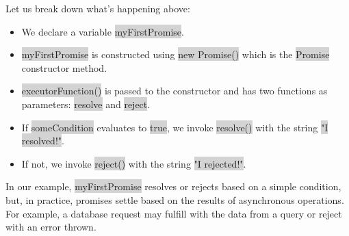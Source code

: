 \documentclass[11pt]{article}
\begin{document}
Let us break down what’s happening above:
\begin{itemize}[leftmargin = *]
\item We declare a variable \colorbox{lightgray}{myFirstPromise}. 
\item \colorbox{lightgray}{myFirstPromise} is constructed using \colorbox{lightgray}{new Promise()} which is the \colorbox{lightgray}{Promise} constructor method.
\item \colorbox{lightgray}{executorFunction()} is passed to the constructor and has two functions as parameters: \colorbox{lightgray}{resolve} and \colorbox{lightgray}{reject}.
\item If \colorbox{lightgray}{someCondition} evaluates to \colorbox{lightgray}{true}, we invoke \colorbox{lightgray}{resolve()} with the string \colorbox{lightgray}{"I resolved!"}. 
\item If not, we invoke \colorbox{lightgray}{reject()} with the string \colorbox{lightgray}{"I rejected!"}.
\end{itemize}
In our example, \colorbox{lightgray}{myFirstPromise} resolves or rejects based on a simple condition, but, in practice, promises settle based on the results of asynchronous operations. For example, a database request may fulfill with the data from a query or reject with an error thrown. 
\end{document}
